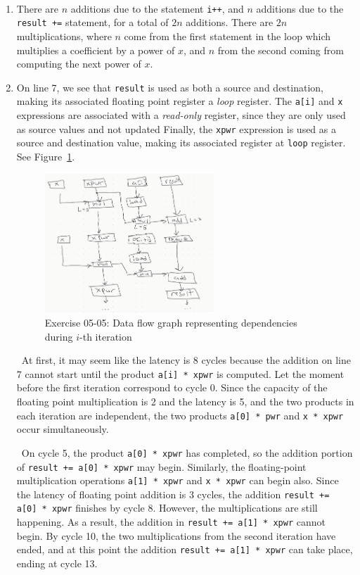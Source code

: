 \documentclass[12pt]{article}
\newenvironment{sol}[1][Solution]{\begin{trivlist}
		\item[\hskip \labelsep {\bfseries #1:}]}{\end{trivlist}}
\begin{document}
\begin{sol}
	\
	\begin{enumerate}[label=(\alph*)]
		\item There are $n$ additions due to the statement \texttt{i++}, and $n$ additions
		due to the \texttt{result +=} statement, for a total of $2n$ additions. There
		are $2n$ multiplications, where $n$ come from the first statement in the loop
		which multiplies a coefficient by a power of $x$, and $n$ from the second coming
		from computing the next power of $x$.
		\item On line 7, we see that \texttt{result} is used as both a source and destination,
		making its associated floating point register a \emph{loop} register. The \texttt{a[i]}
		and \texttt{x} expressions are associated with a \emph{read-only} register, since they are
		only used as source values and not updated Finally, the \texttt{xpwr} expression is used as
		a source and destination value, making its associated register at \texttt{loop} register.
		See Figure~\ref{fig:ex-05-05}.
		\begin{figure}
			\centering
			\includegraphics[width=0.6\textwidth]{exercise-05-05.png}
			\caption{Exercise 05-05: Data flow graph representing dependencies during $i$-th
				iteration}
			\label{fig:ex-05-05}
		\end{figure}
		
		\
		At first, it may seem like the latency is 8 cycles because the addition on
		line 7 cannot start until the product \texttt{a[i] * xpwr} is computed. Let
		the moment before the first iteration correspond to cycle 0. Since the capacity of
		the floating point multiplication is 2 and the latency is 5, and the two products
		in each iteration are independent, the two products \texttt{a[0] * pwr} and
		\texttt{x * xpwr} occur simultaneously.
		
		\
		On cycle 5, the product \texttt{a[0] * xpwr} has completed, so the addition portion
		of \texttt{result += a[0] * xpwr} may begin. Similarly, the floating-point multiplication
		operations \texttt{a[1] * xpwr} and \texttt{x * xpwr} can begin also. Since the latency of
		floating point addition is 3 cycles, the addition \texttt{result += a[0] * xpwr} finishes 
		by cycle 8. However, the multiplications are still happening. As a result, the addition in
		\texttt{result += a[1] * xpwr} cannot begin. By cycle 10, the two multiplications
		from the second iteration have ended, and at this point the addition
		\texttt{result += a[1] * xpwr} can take place, ending at cycle 13.
		

\end{enumerate}
\end{sol}
\end{document}
